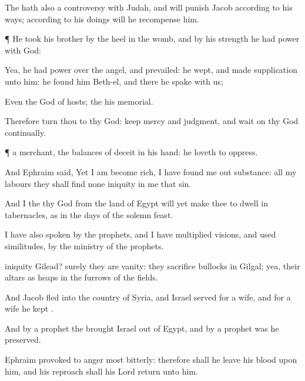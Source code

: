 {The
{} hath also a
controversy with
Judah, and will
punish
Jacob according to his
ways; according to his
doings will he
recompense him.


\par }{\PP {}¶ He took his
brother by the
heel in the
womb, and by his
strength he had
power with
God:

Yea, he had
power over the
angel, and
prevailed: he
wept, and made
supplication unto him: he
found him
{}
Beth-el, and there he
spake with us;

Even the
{}
God of
hosts; the
{}
{} his
memorial.

Therefore
turn thou to thy
God:
keep
mercy and
judgment, and
wait on thy
God
continually.


\par }{\PP {}¶
{} a
merchant, the
balances of
deceit
{} in his
hand: he
loveth to
oppress.

And
Ephraim
said, Yet I am become
rich, I have found me
out
substance:
{} all my
labours they shall
find none
iniquity in me that
{}
sin.

And I
{} the
{} thy
God from the
land of
Egypt will yet make thee to
dwell in
tabernacles, as in the
days of the solemn
feast.

I have also
spoken by the
prophets, and I have
multiplied
visions, and used
similitudes, by the
ministry of the
prophets.

iniquity
{}
Gilead? surely they are
vanity: they
sacrifice
bullocks in
Gilgal; yea, their
altars
{} as
heaps in the
furrows of the
fields.

And
Jacob
fled into the
country of
Syria, and
Israel
served for a
wife, and for a
wife he
kept
{}.

And by a
prophet the
{}
brought
Israel out of
Egypt, and by a
prophet was he
preserved.

Ephraim provoked
{} to
anger most
bitterly: therefore shall he
leave his
blood upon him, and his
reproach shall his
Lord
return unto him.




}
